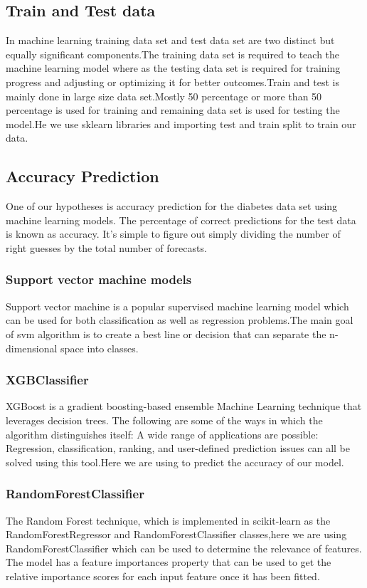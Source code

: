 \documentclass[journal,twoside,web]{ieeecolor}
\begin{document}
\subsection{Train and Test data}
In machine learning training data set and test data set are two distinct but equally significant components.The training data set is required to teach the machine learning model where as the testing data set is required for training progress and adjusting or optimizing it for better outcomes.Train and test is mainly done in large size data set.Mostly 50 percentage or more than 50 percentage is used for training and remaining data set is used for testing the model.He we use sklearn libraries and importing test and train split to train our data.
\subsection{Accuracy Prediction}
One of our hypotheses is accuracy prediction for the diabetes data set using machine learning models.
The percentage of correct predictions for the test data is known as accuracy. It's simple to figure out simply dividing the number of right guesses by the total number of forecasts.
\subsubsection{Support vector machine models}
Support vector machine is a popular supervised machine learning model which can be used for both classification as well as regression problems.The main goal of svm algorithm is to create a best line or decision that can separate the n-dimensional space into classes.
\subsubsection{XGBClassifier}
XGBoost is a gradient boosting-based ensemble Machine Learning technique that leverages decision trees. The following are some of the ways in which the algorithm distinguishes itself: A wide range of applications are possible: Regression, classification, ranking, and user-defined prediction issues can all be solved using this tool.Here we are using to predict the accuracy of our model.
\subsubsection{RandomForestClassifier}
The Random Forest technique, which is implemented in scikit-learn as the RandomForestRegressor and RandomForestClassifier classes,here we are using RandomForestClassifier  which can be used to determine the relevance of features. The model has a feature importances property that can be used to get the relative importance scores for each input feature once it has been fitted.
\end{document}

